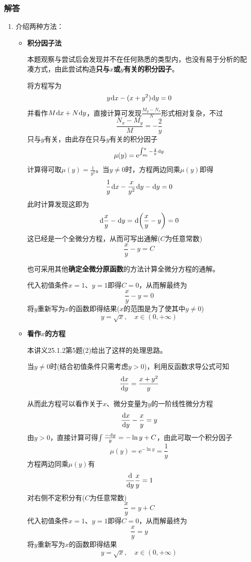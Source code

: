 \documentclass[a4paper,UTF8,fontset=windows,AutoFakeBold]{ctexart}
\newcommand*{\dr}{\hspace{0.07em}\mathrm{d}}
\newcommand*{\er}{\mathrm{e}}
\newcommand*{\note}{\noindent *}
\theoremstyle{ex}
\begin{document}
\subsubsection{解答}
\begin{enumerate}
    \item 介绍两种方法：
    \begin{itemize}
        \item \textbf{积分因子法}
        
        本题观察与尝试后会发现并不在任何熟悉的类型内，也没有易于分析的配凑方式，由此尝试构造\textbf{只与$x$或$y$有关的积分因子}。

        将方程写为
        $$y\dr x-(x+y^2)\dr y=0$$
        并看作$M\dr x+N\dr y$，直接计算可发现$\frac{M_y-N_x}{N}$形式相对复杂，不过
        $$\frac{N_x-M_y}{M}=-\frac{2}{y}$$
        只与$y$有关，由此存在只与$y$有关的积分因子
        $$\mu(y)=\er^{\int_{y_0}^y-\frac{2}{y}\dr y}$$
        计算得可取$\mu(y)=\frac{1}{y^2}$。当$y\ne0$时，方程两边同乘$\mu(y)$即得
        $$\frac{1}{y}\dr x-\frac{x}{y^2}\dr y-\dr y=0$$
        此时计算发现这即为
        $$\dr\frac{x}{y}-\dr y=\dr\bigg(\frac{x}{y}-y\bigg)=0$$
        这已经是一个全微分方程，从而可写出通解($C$为任意常数)
        $$\frac{x}{y}-y=C$$

        \note 也可采用其他\textbf{确定全微分原函数}的方法计算全微分方程的通解。

        代入初值条件$x=1$、$y=1$即得$C=0$，从而解最终为
        $$\frac{x}{y}-y=0$$
        将$y$重新写为$x$的函数即得结果($x$的范围是为了使其中$y\ne0$)
        $$y=\sqrt{x},\quad x\in(0,+\infty)$$
        
        \item \textbf{看作$x$的方程}
        
        \note 本讲义25.1.2第5题(2)给出了这样的处理思路。

        当$y\ne0$时(结合初值条件只需考虑$y>0$)，利用反函数求导公式可知
        $$\frac{\dr x}{\dr y}=\frac{x+y^2}{y}$$
        
        从而此方程可以看作关于$x$、微分变量为$y$的一阶线性微分方程
        $$\frac{\dr x}{\dr y}-\frac{x}{y}=y$$
        由$y>0$，直接计算可得$\int\frac{-\dr y}{y}=-\ln y+C$，由此可取一个积分因子
        $$\mu(y)=\er^{-\ln y}=\frac{1}{y}$$
        方程两边同乘$\mu(y)$有
        $$\frac{\dr}{\dr y}\frac{x}{y}=1$$
        对右侧不定积分有($C$为任意常数)
        $$\frac{x}{y}=y+C$$
        代入初值条件$x=1$、$y=1$即得$C=0$，从而解最终为
        $$\frac{x}{y}=y$$
        将$y$重新写为$x$的函数即得结果
        $$y=\sqrt{x},\quad x\in(0,+\infty)$$
    \end{itemize}


\end{enumerate}
\end{document}

